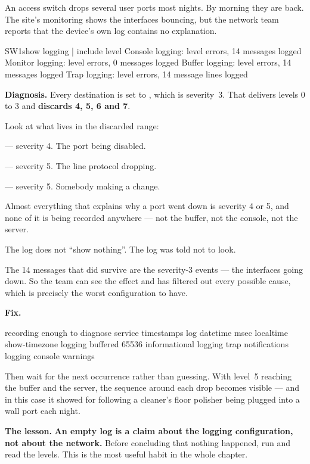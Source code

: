 \begin{breakfix}
An access switch drops several user ports most nights. By morning they are back.
The site's monitoring shows the interfaces bouncing, but the network team reports
that the device's own log contains no explanation.

\begin{verify}{SW1}{show logging | include level}
    Console logging: level errors, 14 messages logged
    Monitor logging: level errors, 0 messages logged
    Buffer logging:  level errors, 14 messages logged
    Trap logging: level errors, 14 message lines logged
\end{verify}

\textbf{Diagnosis.} Every destination is set to , which is severity~3.
That delivers levels 0 to 3 and \textbf{discards 4, 5, 6 and 7}.

Look at what lives in the discarded range:

\begin{tight}
  \item {} --- severity 4. The port being disabled.
  \item {} --- severity 5. The line protocol dropping.
  \item {} --- severity 5. Somebody making a change.
\end{tight}

Almost everything that explains why a port went down is severity 4 or 5, and none
of it is being recorded anywhere --- not the buffer, not the console, not the
server.

The log does not ``show nothing''. The log was told not to look.

The 14 messages that did survive are the severity-3  events
--- the interfaces going down. So the team can see the effect and has filtered out
every possible cause, which is precisely the worst configuration to have.

\textbf{Fix.}

\begin{config}{recording enough to diagnose}
service timestamps log datetime msec localtime show-timezone
logging buffered 65536 informational
logging trap notifications
logging console warnings
\end{config}

Then wait for the next occurrence rather than guessing. With level~5 reaching the
buffer and the server, the sequence around each drop becomes visible --- and in
this case it showed  for 
following a cleaner's floor polisher being plugged into a wall port each night.

\textbf{The lesson.} \textbf{An empty log is a claim about the logging
configuration, not about the network.} Before concluding that nothing happened,
run  and read the levels. This is the most useful habit in the
whole chapter.
\end{breakfix}

